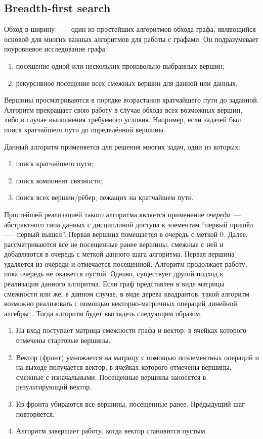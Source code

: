 \subsection{Breadth-first search}
Обход в ширину~—-- один из простейших алгоритмов обхода графа, являющийся основой для многих важных алгоритмов для работы с графами. Он подразумевает поуровневое исследование графа:
\begin{enumerate}
\item  посещение одной или нескольких произвольно выбранных вершин;
\item  рекурсивное посещение всех смежных вершин для данной или данных.
\end{enumerate}
Вершины просматриваются в порядке возрастания кратчайшего пути до заданной. Алгоритм прекращает свою работу в случае обхода всех возможных вершин, либо в случае выполнения требуемого условия. Например, если задачей был поиск кратчайшего пути до определённой вершины. 

Данный алгоритм применяется для решения многих задач, одни из которых:
\begin{enumerate}
    \item  поиск кратчайшего пути;
    \item  поиск компонент связности;
    \item  поиск всех вершин/рёбер, лежащих на кратчайшем пути.
\end{enumerate}

Простейшей реализацией такого алгоритма является применение \textit{очереди}~--- абстрактного типа данных с дисциплиной доступа к элементам \enquote{первый пришёл --— первый вышел}. Первая вершина помещается в очередь с меткой $0$. Далее, рассматриваются все не посещенные ранее вершины, смежные с ней и добавляются в очередь с меткой данного шага алгоритма. Первая вершина удаляется из очереди и отмечается посещенной. Алгоритм продолжает работу, пока очередь не окажется пустой. Однако, существует другой подход к реализации данного алгоритма. Если граф представлен в виде матрицы смежности или же, в данном случае, в виде дерева квадрантов, такой алгоритм возможно реализовать с помощью векторно-матричных операций линейной алгебры~\cite{davis2018algorithm}. Тогда алгоритм будет выглядеть следующим образом.
\begin{enumerate}
    \item  На вход поступает матрица смежности графа и вектор, в ячейках которого отмечены стартовые вершины.
    \item  Вектор (фронт) умножается на матрицу с помощью поэлементных операций и на выходе получается вектор, в ячейках которого отмечены вершины, смежные с изначальными. Посещенные вершины заносятся в результирующий вектор.
    \item  Из фронта убираются все вершины, посещенные ранее. Предыдущий шаг повторяется.
    \item  Алгоритм завершает работу, когда вектор становится пустым.
\end{enumerate}

